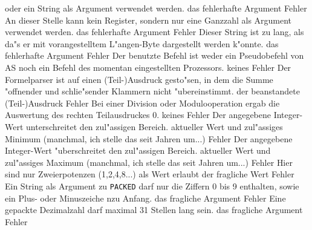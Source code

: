 \documentclass[12pt,a4paper,twoside]{report}
\newcommand{\asname}{AS}
\begin{document}
\begin{description}
{                 oder ein String als Argument verwendet werden.}
               {das fehlerhafte Argument}
               {Fehler}
               {An dieser Stelle kann kein Register, sondern nur eine Ganzzahl
                als Argument verwendet werden.}
               {das fehlerhafte Argument}
               {Fehler}
               {Dieser String ist zu lang, als da"s er mit vorangestelltem
                L"angen-Byte dargestellt werden k"onnte.}
               {das fehlerhafte Argument}
               {Fehler}
               {Der benutzte Befehl ist weder ein Pseudobefehl
                von \asname{} noch ein Befehl des momentan eingestellten
                Prozessors.}
               {keines}
               {Fehler}
               {Der Formelparser ist auf einen (Teil-)Ausdruck
                gesto"sen, in dem die Summe "offnender und schlie"sender
                Klammern nicht "ubereinstimmt.}
               {der beanstandete (Teil-)Ausdruck}
               {Fehler}
               {Bei einer Division oder Modulooperation ergab
                die Auswertung des rechten Teilausdruckes 0.}
               {keines}
               {Fehler}
               {Der angegebene Integer-Wert unterschreitet
                den zul"assigen Bereich.}
               {aktueller Wert und zul"assiges Minimum
	        (manchmal, ich stelle das seit Jahren um...)}
               {Fehler}
               {Der angegebene Integer-Wert "uberschreitet
                den zul"assigen Bereich.}
               {aktueller Wert und zul"assiges Maximum
	        (manchmal, ich stelle das seit Jahren um...)}
               {Fehler}
               {Hier sind nur Zweierpotenzen (1,2,4,8...)
                als Wert erlaubt}
               {der fragliche Wert}
               {Fehler}
               {Ein String als Argument zu {\tt PACKED} darf nur
                die Ziffern 0 bis 9 enthalten, sowie ein Plus- oder
                Minuszeiche nzu Anfang.}
               {das fragliche Argument}
               {Fehler}
               {Eine gepackte Dezimalzahl darf maximal 31 Stellen
                lang sein.}
               {das fragliche Argument}
               {Fehler}

\end{description}
\end{document}
